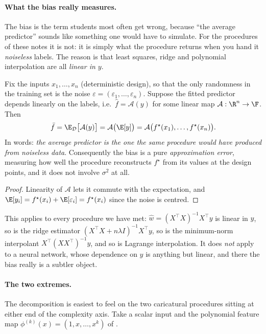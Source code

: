 \paragraph{What the bias really measures.}
The bias is the term students most often get wrong, because ``the average predictor''
sounds like something one would have to simulate. For the procedures of these notes it
is not: it is simply what the procedure returns when you hand it \emph{noiseless}
labels. The reason is that least squares, ridge and polynomial interpolation are all
\emph{linear in $y$}.

\begin{prop}
\label{prop:bias-linear}
Fix the inputs $x_1, \dots, x_n$ (deterministic design), so that the only randomness in
the training set is the noise $\varepsilon = (\varepsilon_1, \dots, \varepsilon_n)$.
Suppose the fitted predictor depends linearly on the labels, i.e.\ $\hat f =
\mathcal{A}(y)$ for some linear map $\mathcal{A} : \R^n \to \F$. Then
\[
\bar f = \E_{\mathcal{D}}\big[ \mathcal{A}(y) \big] = \mathcal{A}\big( \E[y] \big)
= \mathcal{A}\big( f^\star(x_1), \dots, f^\star(x_n) \big) .
\]
In words: \emph{the average predictor is the one the same procedure would have produced
from noiseless data}. Consequently the bias is a pure \emph{approximation error},
measuring how well the procedure reconstructs $f^\star$ from its values at the design
points, and it does not involve $\sigma^2$ at all.
\end{prop}

\begin{proof}
Linearity of $\mathcal{A}$ lets it commute with the expectation, and $\E[y_i] =
f^\star(x_i) + \E[\varepsilon_i] = f^\star(x_i)$ since the noise is centred.
\end{proof}

This applies to every procedure we have met: $\hat w = (X^\top X)^{-1} X^\top y$ is
linear in $y$, so is the ridge estimator $(X^\top X + n\lambda I)^{-1} X^\top y$, so is
the minimum-norm interpolant $X^\top (XX^\top)^{-1} y$, and so is Lagrange
interpolation. It does \emph{not} apply to a neural network, whose dependence on $y$ is
anything but linear, and there the bias really is a subtler object.

\paragraph{The two extremes.}
The decomposition is easiest to feel on the two caricatural procedures sitting at
either end of the complexity axis. Take a scalar input and the polynomial feature map
$\phi^{(k)}(x) = (1, x, \dots, x^k)$ of .

